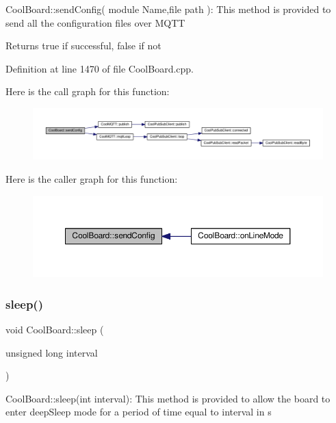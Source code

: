 Cool\+Board\+::send\+Config( module Name,file path )\+: This method is provided to send all the configuration files over M\+Q\+TT

\begin{DoxyReturn}{Returns}
true if successful, false if not 
\end{DoxyReturn}


Definition at line 1470 of file Cool\+Board.\+cpp.

Here is the call graph for this function\+:
\nopagebreak
\begin{figure}[H]
\begin{center}
\leavevmode
\includegraphics[width=350pt]{class_cool_board_a705398b11560603fcdd1b9e8e95d0027_cgraph}
\end{center}
\end{figure}
Here is the caller graph for this function\+:
\nopagebreak
\begin{figure}[H]
\begin{center}
\leavevmode
\includegraphics[width=350pt]{class_cool_board_a705398b11560603fcdd1b9e8e95d0027_icgraph}
\end{center}
\end{figure}
\mbox{\label{class_cool_board_a069952cdcb2e7f68518aa429eceadb6e}} 
\subsubsection{\texorpdfstring{sleep()}{sleep()}}
{\footnotesize\ttfamily void Cool\+Board\+::sleep (\begin{DoxyParamCaption}\item[{unsigned long}]{interval }\end{DoxyParamCaption})}

Cool\+Board\+::sleep(int interval)\+: This method is provided to allow the board to enter deep\+Sleep mode for a period of time equal to interval in s 

